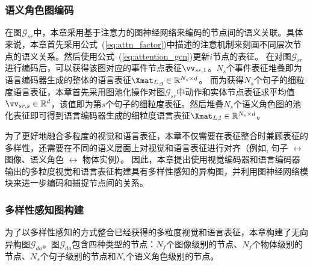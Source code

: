\subsubsection{语义角色图编码}
在图$\mathcal{G}_{sr}$中，本章采用基于注意力的图神经网络来编码的节点间的语义关联。具体来说，本章首先采用公式~(\ref{eq:attn_factor})中描述的注意机制来刻画不同层次节点的语义关系。然后使用公式~(\ref{eq:attention_gcn})更新$i$节点的表征。
在对图$\mathcal{G}_{sr}$进行编码后，可以获得该图对应的事件节点表征$\vv_{sr, 1}$。$N_s$个事件表征堆叠即为语言编码器生成的整体的语言表征$\Xmat_{L, g}\in \mathbb{R}^{N_s\times d}$。
而为获得$N_s$个句子的细粒度语言表征，本章首先采用图池化操作对图$\mathcal{G}_{sr}$中动作和实体节点表征求平均值$\bar{\vv}_{sr, s}\in \mathbb{R}^d$，该值即为第$s$个句子的细粒度表征。然后堆叠$N_s$个语义角色图的池化表征即可得到语言编码器生成的细粒度语言表征$\Xmat_{L, l} \in \mathbb{R}^{N_s \times d}$。



为了更好地融合多粒度的视觉和语言表征，本章不仅需要在表征整合时兼顾表征的多样性，还需要在不同的语义层面上对视觉和语言表征进行对齐（例如, 句子 $\leftrightarrow$ 图像、语义角色 $\leftrightarrow$ 物体实例）。
因此，本章提出使用视觉编码器和语言编码器输出的多粒度视觉和语言表征构建具有多样性感知的异构图，并利用图神经网络模块来进一步编码和捕捉节点间的关系。


\subsubsection{多样性感知图构建}
为了以多样性感知的方式整合已经获得的多粒度视觉和语言表征，本章构建了无向异构图$\mathcal{G}_{da}$。图$\mathcal{G}_{da}$包含四种类型的节点：$N_f$个图像级别的节点、$N_f$个物体级别的节点、$N_s$个句子级别的节点和$N_s$个语义角色级别的节点。



